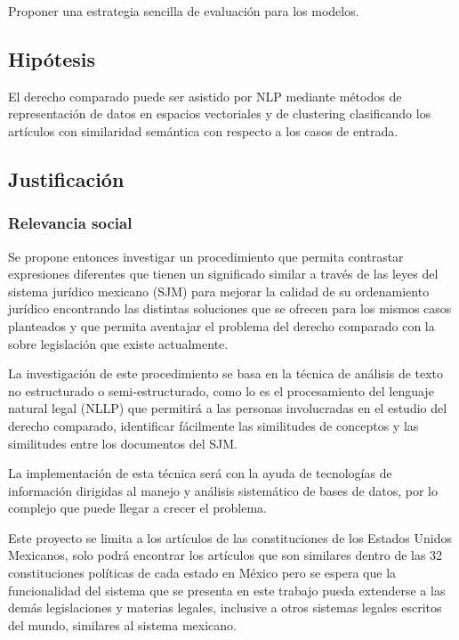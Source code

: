 \documentclass[12pt]{article}
\begin{document}
			Proponer una estrategia sencilla de evaluación para los modelos. 
			
		
		\subsection{Hipótesis}
		El derecho comparado puede ser asistido por NLP mediante métodos de representación de datos en espacios vectoriales y de clustering clasificando los artículos con similaridad semántica con respecto a los casos de entrada.
		
		
		
		\subsection{Justificación}
			\subsubsection{Relevancia social}
			Se propone entonces investigar un procedimiento que permita contrastar expresiones diferentes que tienen un significado similar a través de las leyes del sistema jurídico mexicano (SJM) para mejorar la calidad de su ordenamiento jurídico encontrando las distintas soluciones que se ofrecen para los mismos casos planteados y que permita aventajar el problema del derecho comparado con la sobre legislación que existe actualmente.
	
			La investigación de este procedimiento se basa en la técnica de análisis de texto no estructurado o semi-estructurado, como lo es el procesamiento del lenguaje natural legal (NLLP) que permitirá a las personas involucradas en el estudio del derecho comparado, identificar fácilmente las similitudes de conceptos y las similitudes entre los documentos  del SJM.	
			
			La implementación de esta técnica será con la ayuda de tecnologías de información dirigidas al manejo y análisis sistemático de bases de datos, por lo complejo que puede llegar a crecer el problema. 
			
			Este proyecto se limita a los artículos de las constituciones de los Estados Unidos Mexicanos, solo podrá encontrar los artículos que son similares dentro de las 32 constituciones políticas de cada estado en México pero se espera que la funcionalidad del sistema que se presenta en este trabajo pueda extenderse a las demás legislaciones y materias legales, inclusive a otros sistemas legales escritos del mundo, similares al sistema mexicano.
			
\end{document}
